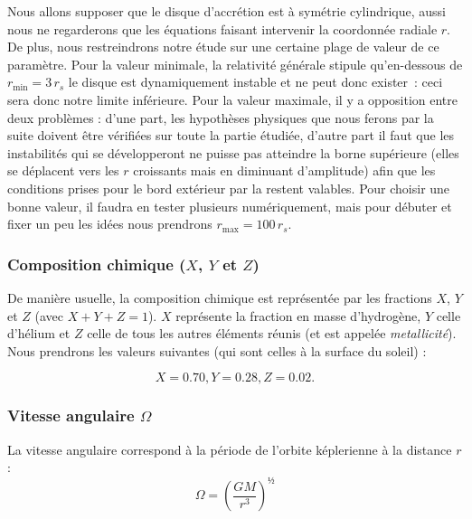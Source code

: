 Nous allons supposer que le disque d’accrétion est à symétrie cylindrique,
aussi nous ne regarderons que les équations faisant intervenir la coordonnée
radiale $r$. De plus, nous restreindrons notre étude sur une certaine plage de
valeur de ce paramètre. Pour la valeur minimale, la relativité générale stipule
qu’en-dessous de $r_\mathrm{min} = \num{3}\, r_s$ le disque est dynamiquement instable et ne
peut donc exister : ceci sera donc notre limite inférieure. Pour la valeur
maximale, il y a opposition entre deux problèmes : d’une part, les hypothèses
physiques que nous ferons par la suite doivent être vérifiées sur toute la
partie étudiée, d’autre part il faut que les instabilités qui se développeront
ne puisse pas atteindre la borne supérieure (elles se déplacent vers les $r$
croissants mais en diminuant d’amplitude) afin que les conditions prises pour
le bord extérieur par la restent valables. Pour choisir une bonne valeur, il
faudra en tester plusieurs numériquement, mais pour débuter et fixer un peu les
idées nous prendrons $r_\mathrm{max} = \num{100}\, r_s$.

\subsubsection{\texorpdfstring{Composition chimique ($X$, $Y$ et $Z$)}{Composition chimique (X, Y et Z)}}

De manière usuelle, la composition chimique est représentée par les fractions
$X$, $Y$ et $Z$ (avec $X + Y + Z = 1$). $X$ représente la fraction en masse
d’hydrogène, $Y$ celle d’hélium et $Z$ celle de tous les autres éléments réunis
(et est appelée \textit{metallicité}). Nous prendrons les valeurs suivantes
(qui sont celles à la surface du soleil) :

\begin{equation}
    \label{eq:compo_chimique}
    X = \num{0.70}, Y = \num{0.28}, Z = \num{0.02}.
\end{equation}

\subsubsection{\texorpdfstring{Vitesse angulaire $\Omega$}{Vitesse angulaire Ω}}

La vitesse angulaire correspond à la période de l’orbite képlerienne à la distance $r$ :
\begin{equation}
    \label{eq:vitesse_angulaire}
    \Omega = \left( \frac{G M}{r^3} \right)^½
\end{equation}

